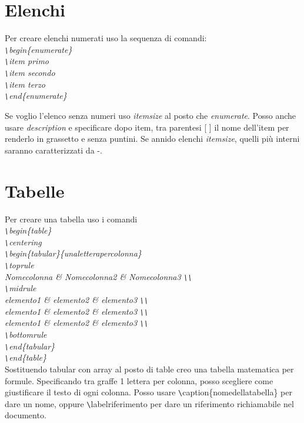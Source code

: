 \section{Elenchi}
Per creare elenchi numerati uso la sequenza di comandi:\\
{\itshape
\verb|\|begin\{enumerate\} \\
\verb|\|item primo \\
\verb|\|item secondo \\
\verb|\|item terzo \\
\verb|\|end\{enumerate\}}

Se voglio l'elenco senza numeri uso \textit{itemsize} al posto che \textit{enumerate}.
Posso anche usare \textit{description} e specificare dopo item, tra parentesi [ ] il nome dell'item per renderlo in grassetto e senza puntini. Se annido elenchi \textit{itemsize}, quelli più interni saranno caratterizzati da -.

\section{Tabelle}
Per creare una tabella uso i comandi\\
{\itshape
\verb|\|begin\{table\}\\
\verb|\|centering\\
\verb|\|begin\{tabular\}\{unaletterapercolonna\}\\
\verb|\|toprule\\
Nomecolonna \& Nomecolonna2 \& Nomecolonna3 \verb|\\| \\
\verb|\|midrule \\
elemento1 \& elemento2 \& elemento3 \verb|\\| \\
elemento1 \& elemento2 \& elemento3 \verb|\\| \\
elemento1 \& elemento2 \& elemento3 \verb|\\| \\
\verb|\|bottomrule \\
\verb|\|end\{tabular\} \\
\verb|\|end\{table\}} \\

Sostituendo tabular con array al posto di table creo una tabella matematica per formule. Specificando tra graffe 1 lettera per colonna, posso scegliere come giustificare il testo di ogni colonna. Posso usare \verb|\|caption\{nomedellatabella\} per dare un nome, oppure \verb|\|label{riferimento} per dare un riferimento richiamabile nel documento.

